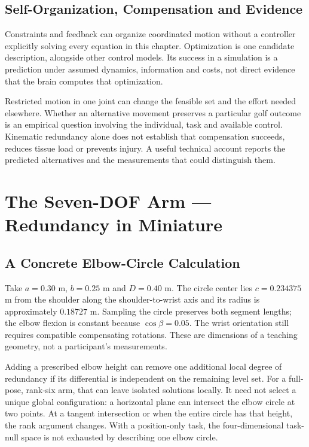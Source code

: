 \subsection{Self-Organization, Compensation and Evidence}

Constraints and feedback can organize coordinated motion without a controller explicitly solving every equation in this chapter. Optimization is one candidate description, alongside other control models. Its success in a simulation is a prediction under assumed dynamics, information and costs, not direct evidence that the brain computes that optimization.

Restricted motion in one joint can change the feasible set and the effort needed elsewhere. Whether an alternative movement preserves a particular golf outcome is an empirical question involving the individual, task and available control. Kinematic redundancy alone does not establish that compensation succeeds, reduces tissue load or prevents injury. A useful technical account reports the predicted alternatives and the measurements that could distinguish them.

\section{The Seven-DOF Arm --- Redundancy in Miniature}
\label{sec:arm_redundancy_detailed}

\subsection{A Concrete Elbow-Circle Calculation}

Take $a=0.30$ m, $b=0.25$ m and $D=0.40$ m. The circle center lies $c=0.234375$ m from the shoulder along the shoulder-to-wrist axis and its radius is approximately $0.18727$ m. Sampling the circle preserves both segment lengths; the elbow flexion is constant because $\cos\beta=0.05$. The wrist orientation still requires compatible compensating rotations. These are dimensions of a teaching geometry, not a participant's measurements.

Adding a prescribed elbow height can remove one additional local degree of redundancy if its differential is independent on the remaining level set. For a full-pose, rank-six arm, that can leave isolated solutions locally. It need not select a unique global configuration: a horizontal plane can intersect the elbow circle at two points. At a tangent intersection or when the entire circle has that height, the rank argument changes. With a position-only task, the four-dimensional task-null space is not exhausted by describing one elbow circle.

